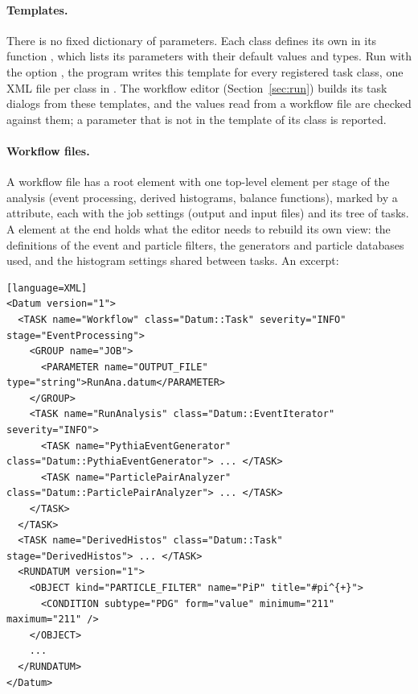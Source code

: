 \paragraph{Templates.}
There is no fixed dictionary of parameters. Each class defines its own in its function
, which lists its parameters with their default values and types. Run with the option , the  program writes this
template for every registered task class, one XML file per class in . The workflow editor 
(Section~\ref{sec:run}) builds its task dialogs from these templates, and the values read from a workflow file are
checked against them; a parameter that is not in the template of its class is reported.

\paragraph{Workflow files.}
A workflow file has a  root element with one top-level  element per stage of the analysis (event
processing, derived histograms, balance functions), marked by a  attribute, each with the job settings
(output and input files) and its tree of tasks. A  element at the end holds what the editor needs to rebuild
its own view: the definitions of the event and particle filters, the generators and particle databases used, and the
histogram settings shared between tasks. An excerpt:
\begin{widetext}
\begin{verbatim}[language=XML]
<Datum version="1">
  <TASK name="Workflow" class="Datum::Task" severity="INFO" stage="EventProcessing">
    <GROUP name="JOB">
      <PARAMETER name="OUTPUT_FILE" type="string">RunAna.datum</PARAMETER>
    </GROUP>
    <TASK name="RunAnalysis" class="Datum::EventIterator" severity="INFO">
      <TASK name="PythiaEventGenerator" class="Datum::PythiaEventGenerator"> ... </TASK>
      <TASK name="ParticlePairAnalyzer" class="Datum::ParticlePairAnalyzer"> ... </TASK>
    </TASK>
  </TASK>
  <TASK name="DerivedHistos" class="Datum::Task" stage="DerivedHistos"> ... </TASK>
  <RUNDATUM version="1">
    <OBJECT kind="PARTICLE_FILTER" name="PiP" title="#pi^{+}">
      <CONDITION subtype="PDG" form="value" minimum="211" maximum="211" />
    </OBJECT>
    ...
  </RUNDATUM>
</Datum>
\end{verbatim}
\end{widetext}